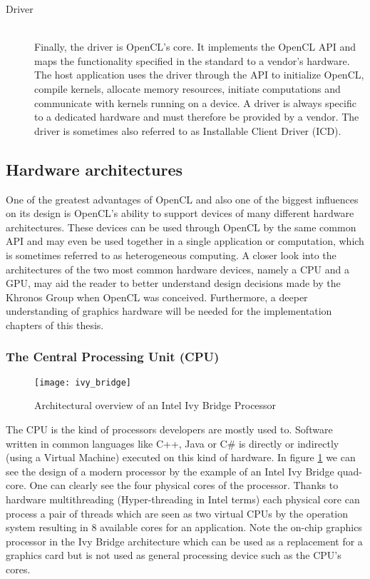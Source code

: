 \begin{description}
	\item[Driver] \hfill \\
	Finally, the driver is OpenCL's core. It implements the OpenCL API and maps the functionality specified in the standard to a vendor's hardware. The host application uses the driver through the API to initialize OpenCL, compile kernels, allocate memory resources, initiate computations and communicate with kernels running on a device. A driver is always specific to a dedicated hardware and must therefore be provided by a vendor. The driver is sometimes also referred to as Installable Client Driver (ICD).
\end{description}

\subsection{Hardware architectures}

One of the greatest advantages of OpenCL and also one of the biggest influences on its design is OpenCL's ability to support devices of many different hardware architectures. These devices can be used through OpenCL by the same common API and may even be used together in a single application or computation, which is sometimes referred to as heterogeneous computing.
A closer look into the architectures of the two most common hardware devices, namely a CPU and a GPU, may aid the reader to better understand design decisions made by the Khronos Group when OpenCL was conceived. Furthermore, a deeper understanding of graphics hardware will be needed for the implementation chapters of this thesis.

\subsubsection{The Central Processing Unit (CPU)}

\begin{figure}[h] %
\centering
\texttt{[image: ivy\_bridge]}
\caption{Architectural overview of an Intel Ivy Bridge Processor \cite{}}
\label{fig:ivy_bridge}
\end{figure}

The CPU is the kind of processors developers are mostly used to. Software written in common languages like C++, Java or C\# is directly or indirectly (using a Virtual Machine) executed on this kind of hardware.
In figure \ref{fig:ivy_bridge} we can see the design of a modern processor by the example of an Intel Ivy Bridge quad-core. One can clearly see the four physical cores of the processor. Thanks to hardware multithreading (Hyper-threading in Intel terms) each physical core can process a pair of threads which are seen as two virtual CPUs by the operation system resulting in 8 available cores for an application.
Note the on-chip graphics processor in the Ivy Bridge architecture which can be used as a replacement for a graphics card but is not used as general processing device such as the CPU's cores.

